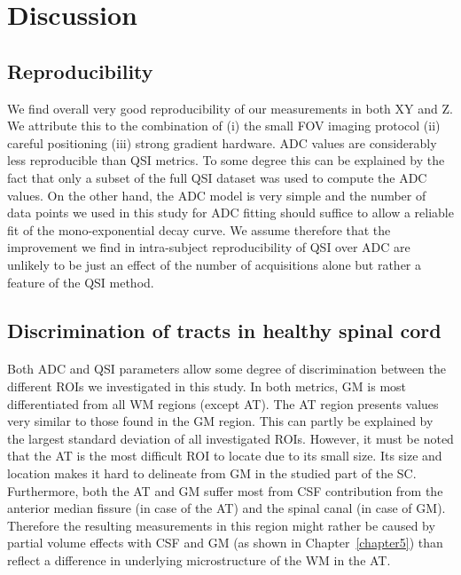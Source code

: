 \section{Discussion}
\subsection{Reproducibility}
 We find overall very good reproducibility of our measurements in both XY and Z. We attribute this to the combination of (i) the small FOV imaging protocol (ii) careful positioning  (iii) strong gradient hardware. ADC values are considerably less reproducible than QSI metrics. To some degree this can be explained by the fact that only a subset of the full QSI dataset was used to compute the ADC values. On the other hand, the ADC model is very simple and the number of data points we used in this study for ADC fitting should suffice to allow a reliable fit of the mono-exponential decay curve. We assume therefore that the improvement we find in intra-subject reproducibility of QSI over ADC are unlikely to be just an effect of the number of acquisitions alone but rather a feature of the QSI method.

\subsection{Discrimination of tracts in healthy spinal cord}
\paragraph{} Both ADC and QSI parameters allow some degree of discrimination between the different \glspl{ROI} we investigated in this study. In both metrics, GM is most differentiated from all WM regions (except AT). The AT region presents values very similar to those found in the GM region. This can partly be explained by the largest standard deviation of all investigated \glspl{ROI}. However, it must be noted that the AT is the most difficult \gls{ROI} to locate due to its small size. Its size and location makes it hard to delineate from GM in the studied part of the \gls{SC}. Furthermore, both the AT and GM suffer most from \gls{CSF} contribution from the anterior median fissure (in case of the AT) and the spinal canal (in case of GM). Therefore the resulting measurements in this region might rather be caused by partial volume effects with \gls{CSF} and GM (as shown in Chapter~\ref{chapter5}) than reflect a difference in underlying microstructure of the WM in the AT.


